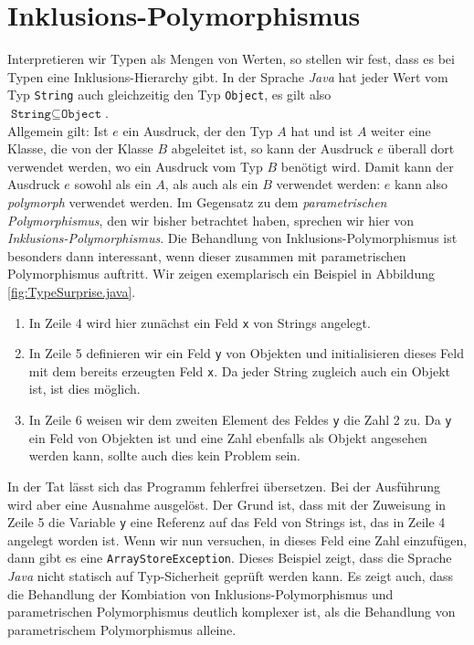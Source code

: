 \section{Inklusions-Polymorphismus}
Interpretieren wir Typen als Mengen von Werten, so stellen wir fest, dass es bei Typen eine
Inklusions-Hierarchy gibt.  In der Sprache \textsl{Java} hat jeder Wert vom Typ \texttt{String} auch
gleichzeitig den Typ \texttt{Object}, es gilt also
\\[0.2cm]
\hspace*{1.3cm}
$\texttt{String} \subseteq \texttt{Object}$.
\\[0.2cm]
Allgemein gilt: Ist $e$ ein Ausdruck, der den Typ $A$ hat und ist $A$ weiter eine Klasse, die von der
Klasse $B$ abgeleitet ist, so kann der Ausdruck $e$ \"uberall dort verwendet werden, wo ein Ausdruck vom Typ
$B$ ben\"otigt wird.  Damit kann der Ausdruck $e$ sowohl als ein $A$, als auch als ein $B$ verwendet werden:
$e$ kann also \emph{polymorph} verwendet werden.  Im Gegensatz zu dem \emph{parametrischen Polymorphismus},
den wir bisher betrachtet haben, sprechen wir hier von \emph{Inklusions-Polymorphismus}.  Die Behandlung von
Inklusions-Polymorphismus ist besonders dann interessant, wenn dieser zusammen mit parametrischen
Polymorphismus auftritt.  Wir zeigen exemplarisch ein Beispiel in Abbildung \ref{fig:TypeSurprise.java}.
\begin{enumerate}
\item In Zeile 4 wird hier zun\"achst ein Feld \texttt{x} von Strings angelegt.
\item In Zeile 5 definieren wir ein Feld \texttt{y} von Objekten und initialisieren dieses Feld mit
      dem bereits erzeugten Feld \texttt{x}.  Da jeder String zugleich auch ein Objekt ist,
      ist dies m\"oglich.
\item In Zeile 6 weisen wir dem zweiten Element des Feldes \texttt{y} die Zahl 2 zu.
      Da \texttt{y} ein Feld von Objekten ist und eine Zahl ebenfalls als Objekt angesehen werden kann,
      sollte auch dies kein Problem sein.
\end{enumerate}
In der Tat l\"asst sich das Programm fehlerfrei \"ubersetzen.  Bei der Ausf\"uhrung wird aber eine Ausnahme
ausgel\"ost.  Der Grund ist, dass mit der Zuweisung in Zeile 5 die Variable \texttt{y} eine Referenz auf das
Feld von Strings ist, das in Zeile 4 angelegt worden ist.  Wenn wir nun versuchen, in dieses Feld eine Zahl
einzuf\"ugen, dann gibt es eine \texttt{ArrayStoreException}.  Dieses Beispiel zeigt, dass die Sprache
\textsl{Java} nicht statisch auf Typ-Sicherheit gepr\"uft werden kann.  Es zeigt auch, dass die Behandlung der
Kombiation von Inklusions-Polymorphismus und parametrischen Polymorphismus deutlich komplexer ist, als die
Behandlung von parametrischem Polymorphismus alleine.

